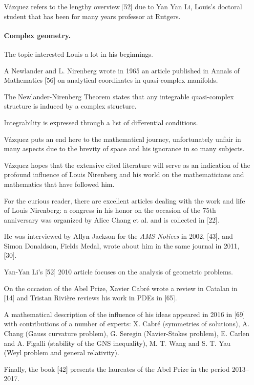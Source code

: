\documentclass{article}
\begin{document}
V\'azquez refers to the lengthy overview [52] due to Yan Yan Li, Louis's doctoral student that has been for many years professor at Rutgers.

\paragraph{Complex geometry.} The topic interested Louis a lot in his beginnings.

A Newlander and L. Nirenberg wrote in 1965 an article published in Annals of Mathematics [56] on analytical coordinates in quasi-complex manifolds.

The Newlander-Nirenberg Theorem states that any integrable quasi-complex structure is induced by a complex structure.

Integrability is expressed through a list of differential conditions.

%
V\'azquez puts an end here to the mathematical journey, unfortunately unfair in many aspects due to the brevity of space and his ignorance in so many subjects.

V\'azquez hopes that the extensive cited literature will serve as an indication of the profound influence of Louis Nirenberg and his world on the mathematicians and mathematics that have followed him.

For the curious reader, there are excellent articles dealing with the work and life of Louis Nirenberg: a congress in his honor on the occasion of the 75th anniversary was organized by Alice Chang et al. and is collected in [22].

He was interviewed by Allyn Jackson for the \textit{AMS Notices} in 2002, [43], and Simon Donaldson, Fields Medal, wrote about him in the same journal in 2011, [30].

Yan-Yan Li's [52] 2010 article focuses on the analysis of geometric problems.

On the occasion of the Abel Prize, Xavier Cabré wrote a review in Catalan in [14] and Tristan Rivi\`ere reviews his work in PDEs in [65].

A mathematical description of the influence of his ideas appeared in 2016 in [69] with contributions of a number of experts: X. Cabr\'e (symmetries of solutions), A. Chang (Gauss curvature problem), G. Seregin (Navier-Stokes problem), E. Carlen and A. Figalli (stability of the GNS inequality), M. T. Wang and S. T. Yau (Weyl problem and general relativity).

Finally, the book [42] presents the laureates of the Abel Prize in the period 2013--2017.
\end{document}
